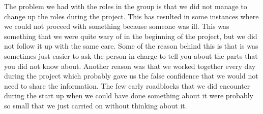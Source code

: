 The problem we had with the roles in the group is that we did not manage to change up the roles during the project. This has resulted in some instances where we could not proceed with something because someone was ill. This was something that we were quite wary of in the beginning of the project, but we did not follow it up with the same care. Some of the reason behind this is that is was sometimes just easier to ask the person in charge to tell you about the parts that you did not know about. Another reason was that we worked together every day during the project which probably gave us the false confidence that we would not need to share the information. The few early roadblocks that we did encounter during the start up when we could have done something about it were probably so small that we just carried on without thinking about it. 